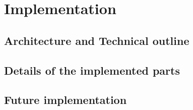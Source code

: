 \chapter{Implementation}\label{chapter:Implementation}

\section{Architecture and Technical outline}
\section{Details of the implemented parts}
\section{Future implementation}
 
		

